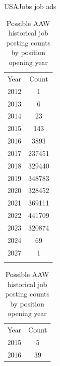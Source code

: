 \documentclass{beamer}
\begin{document}
\begin{frame}{USAJobs job ads}
  \small
  \vspace*{-1.1cm}
  \begin{table}[ht!]
    \centering
    \vspace*{4mm}
    \begin{subtable}[t]{0.4\linewidth}
        \centering
        \caption{Historical job posting counts by position opening year}
        \begin{tabular}{cc}
            \Xhline{3\arrayrulewidth}
            Year &   Count \\\Xhline{3\arrayrulewidth}
            2012 &       1 \\
            2013 &       6 \\
            2014 &      23 \\
            2015 &     143 \\
            2016 &    3893 \\
            2017 &  237451 \\
            2018 &  329440 \\
            2019 &  348783 \\
            2020 &  328452 \\
            2021 &  369111 \\
            2022 &  441709 \\
            2023 &  320874 \\
            2024 &      69 \\
            2027 &       1 \\
            \Xhline{3\arrayrulewidth}
        \end{tabular}\label{tab:job_opening_count}
    \end{subtable}
    \begin{subtable}[t]{0.4\linewidth}
        \centering
        \caption{Possible AAW historical job posting counts by position opening year}
        \vspace*{4mm}
        \begin{tabular}{cc}
            \Xhline{3\arrayrulewidth}
                Year &  Count\\\Xhline{3\arrayrulewidth}
                2015 &      5\\
                2016 &     39\\

\end{tabular}
\end{subtable}
\end{table}
\end{frame}
\end{document}

